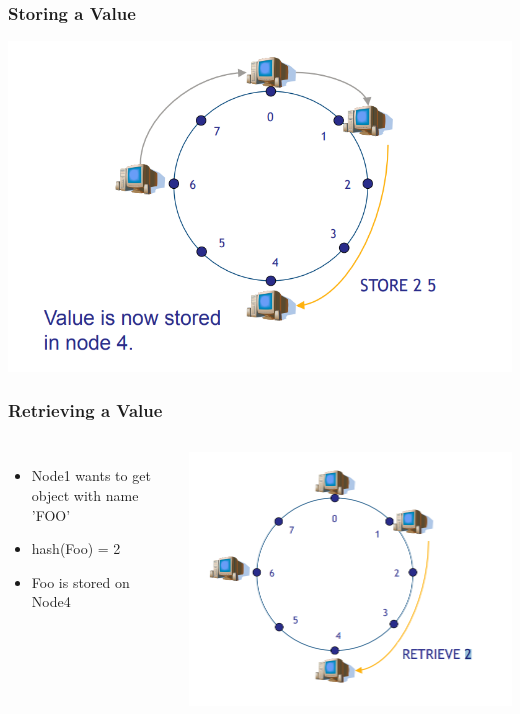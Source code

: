 \begin{frame}
    \frametitle{Storing a Value}
    \includegraphics[scale=0.3]{figures/chord9.png}
\end{frame}

\begin{frame}
    \frametitle{Retrieving a Value}
    \begin{columns}
        \begin{itemize}
            \item Node1 wants to get object with name 'FOO'
            \item hash(Foo) = 2
            \item Foo is stored on Node4
        \end{itemize}
            \includegraphics[scale=0.26]{figures/chord10.png}
    \end{columns}
\end{frame}

